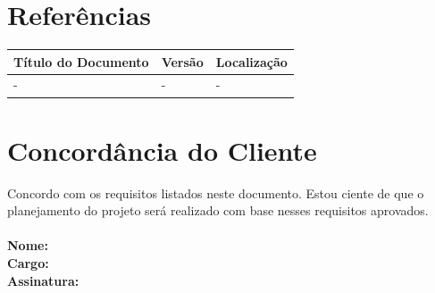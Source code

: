 \documentclass[a4paper, 12pt]{article}
\begin{document}
\section{Referências}
\begin{table}[ht]
	\centering

	\begin{tabular}{p{4cm}p{2cm}p{7.5cm}}
		\hline
		\cellcolor{gray}Título do Documento&\cellcolor{gray}Versão&\cellcolor{gray}Localização  \\
		\hline
		-&-&-\\
		\hline
	\end{tabular}
\end{table}
\section{Concordância do Cliente}
Concordo com os requisitos listados neste documento. Estou ciente de que o planejamento do projeto será realizado com base nesses requisitos aprovados.
\\\\
\textbf{Nome:}
\\
\textbf{Cargo:}
\\
\textbf{Assinatura:}
\end{document}
